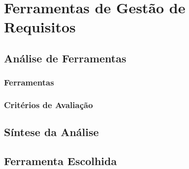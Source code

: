 \chapter[Ferramentas de Gestão de Requisitos]{Ferramentas de Gestão de Requisitos}\label{cap1}
\section{Análise de Ferramentas}
\subsection{Ferramentas}
\subsection{Critérios de Avaliação}
\section{Síntese da Análise}
\section{Ferramenta Escolhida}
